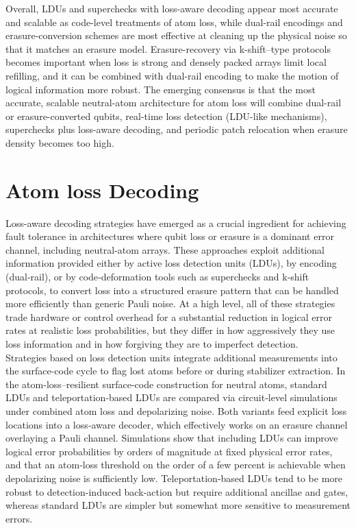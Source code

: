 \documentclass{article}
\begin{document}
Overall, LDUs and superchecks with loss-aware decoding appear most accurate and scalable as code-level treatments of atom loss, while dual-rail encodings and erasure-conversion schemes are most effective at cleaning up the physical noise so that it matches an erasure model. 
Erasure-recovery via k-shift–type protocols becomes important when loss is strong and densely packed arrays limit local refilling, and it can be combined with dual-rail encoding to make the motion of logical information more robust. 
The emerging consensus is that the most accurate, scalable neutral-atom architecture for atom loss will combine dual-rail or erasure-converted qubits, real-time loss detection (LDU-like mechanisms), superchecks plus loss-aware decoding, and periodic patch relocation when erasure density becomes too high.\\

\section{Atom loss Decoding}
Loss-aware decoding strategies have emerged as a crucial ingredient for achieving fault tolerance in architectures where qubit loss or erasure is a dominant error channel, including neutral-atom arrays. 
These approaches exploit additional information provided either by active loss detection units (LDUs), by encoding (dual‑rail), or by code‑deformation tools such as superchecks and k‑shift protocols, to convert loss into a structured erasure pattern that can be handled more efficiently than generic Pauli noise. 
At a high level, all of these strategies trade hardware or control overhead for a substantial reduction in logical error rates at realistic loss probabilities, but they differ in how aggressively they use loss information and in how forgiving they are to imperfect detection.\\

Strategies based on loss detection units integrate additional measurements into the surface-code cycle to flag lost atoms before or during stabilizer extraction. 
In the atom-loss–resilient surface-code construction for neutral atoms, standard LDUs and teleportation‑based LDUs are compared via circuit‑level simulations under combined atom loss and depolarizing noise. 
Both variants feed explicit loss locations into a loss‑aware decoder, which effectively works on an erasure channel overlaying a Pauli channel. 
Simulations show that including LDUs can improve logical error probabilities by orders of magnitude at fixed physical error rates, and that an atom‑loss threshold on the order of a few percent is achievable when depolarizing noise is sufficiently low. 
Teleportation‑based LDUs tend to be more robust to detection-induced back‑action but require additional ancillae and gates, whereas standard LDUs are simpler but somewhat more sensitive to measurement errors.\\
\end{document}
